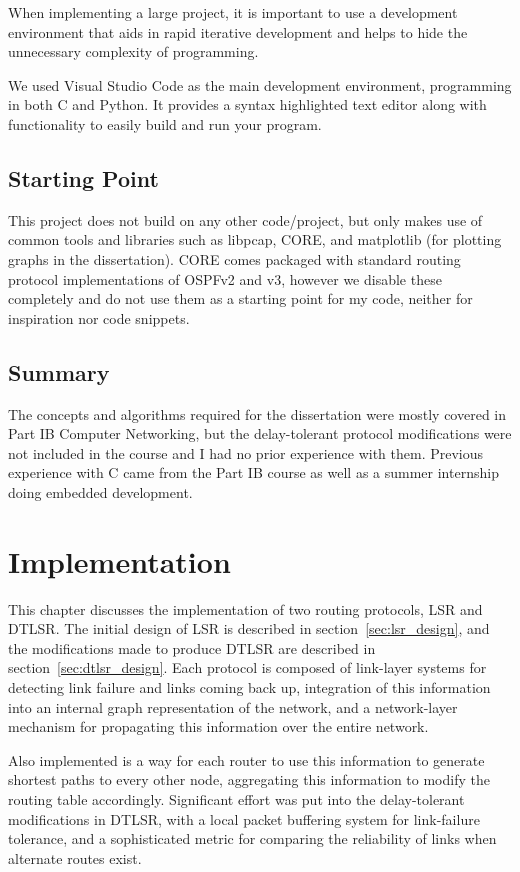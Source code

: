 \documentclass[withindex,glossary,openany]{cam-thesis}
\begin{document}
When implementing a large project, it is important to use a development environment that aids in rapid iterative development and helps to hide the unnecessary complexity of programming.

We used Visual Studio Code as the main development environment, programming in both C and Python. It provides a syntax highlighted text editor along with functionality to easily build and run your program.

\section{Starting Point}

This project does not build on any other code/project, but only makes use of common tools and libraries such as libpcap, CORE, and matplotlib (for plotting graphs in the dissertation). CORE comes packaged with standard routing protocol implementations of OSPFv2 and v3, however we disable these completely and do not use them as a starting point for my code, neither for inspiration nor code snippets.

\section{Summary}

The concepts and algorithms required for the dissertation were mostly covered in Part IB Computer Networking, but the delay-tolerant protocol modifications were not included in the course and I had no prior experience with them. Previous experience with C came from the Part IB course as well as a summer internship doing embedded development.

\chapter{Implementation}

This chapter discusses the implementation of two routing protocols, LSR and DTLSR. The initial design of LSR is described in section~\ref{sec:lsr_design}, and the modifications made to produce DTLSR are described in section~\ref{sec:dtlsr_design}. Each protocol is composed of link-layer systems for detecting link failure and links coming back up, integration of this information into an internal graph representation of the network, and a network-layer mechanism for propagating this information over the entire network.

Also implemented is a way for each router to use this information to generate shortest paths to every other node, aggregating this information to modify the routing table accordingly. Significant effort was put into the delay-tolerant modifications in DTLSR, with a local packet buffering system for link-failure tolerance, and a sophisticated metric for comparing the reliability of links when alternate routes exist.
\end{document}
